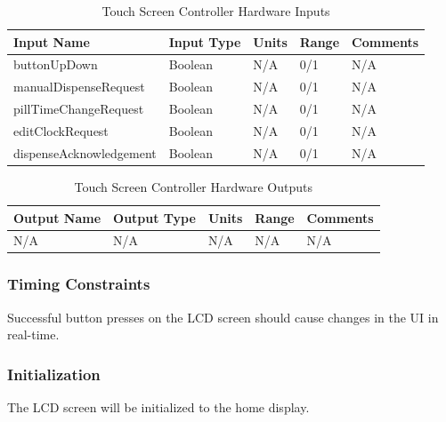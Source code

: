 \documentclass[12pt,titlepage]{article}
\begin{document}
\begin{table}[ht!]
\begin{center}
\begin{adjustbox}{max width=\textwidth}
\small
\begin{tabular}{|p{}|p{}|p{}|p{}|p{}|}
 \hline
 \textbf{Input Name} & \textbf{Input Type} & \textbf{Units} &\textbf{Range} & \textbf{Comments} \\
 \hline 
 buttonUpDown & Boolean & N/A & 0/1 & N/A \\
 \hline
 manualDispenseRequest & Boolean & N/A & 0/1 & N/A \\
 \hline
 pillTimeChangeRequest & Boolean & N/A & 0/1 & N/A \\
 \hline
 editClockRequest & Boolean & N/A & 0/1 & N/A \\
 \hline
 dispenseAcknowledgement & Boolean & N/A & 0/1 & N/A \\
 \hline
\end{tabular}
\end{adjustbox}
\end{center}
\caption{Touch Screen Controller Hardware Inputs}
\end{table}

\begin{table}[ht!]
\begin{center}
\begin{adjustbox}{max width=\textwidth}
\small
\begin{tabular}{|p{}|p{}|p{}|p{}|p{}|}
 \hline
 \textbf{Output Name} & \textbf{Output Type} & \textbf{Units} &\textbf{Range} & \textbf{Comments} \\
 \hline 
 N/A & N/A & N/A & N/A & N/A \\
 \hline
\end{tabular}
\end{adjustbox}
\end{center}
\caption{Touch Screen Controller Hardware Outputs}
\end{table}

\subsubsection*{Timing Constraints}
Successful button presses on the LCD screen should cause changes in the UI in real-time.
\subsubsection*{Initialization}
The LCD screen will be initialized to the home display.
\end{document}
